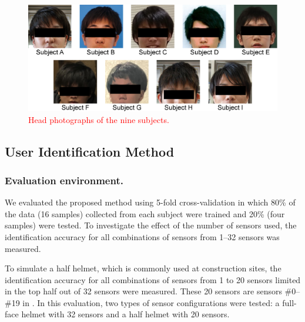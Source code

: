 \documentclass[english,preprint,JIP]{ipsj}
\begin{document}
\begin{figure}[!t]
  \centering
    \includegraphics[width=1\linewidth]{figure/subjects.eps}
  \caption{\textcolor{red}{Head photographs of the nine subjects.}}
  \label{fig:subjects}
\end{figure}


\subsection{User Identification Method}


\subsubsection{Evaluation environment.}
We evaluated the proposed method using 5-fold cross-validation in which 80\% of the data (16 samples) collected from each subject were trained and 20\% (four samples) were tested. To investigate the effect of the number of sensors used, the identification accuracy for all combinations of sensors from 1–32 sensors was measured.\par

To simulate a half helmet, which is commonly used at construction sites, the identification accuracy for all combinations of sensors from 1 to 20 sensors limited in the top half out of 32 sensors were measured. These 20 sensors are sensors \#0--\#19 in . In this evaluation, two types of sensor configurations were tested: a full-face helmet with 32 sensors and a half helmet with 20 sensors.


\end{document}
